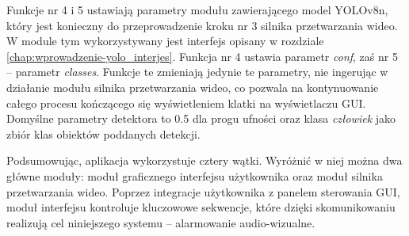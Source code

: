 Funkcje nr 4 i 5 ustawiają parametry modułu zawierającego model YOLOv8n, który jest konieczny do przeprowadzenie kroku nr 3 silnika przetwarzania wideo. 
W module tym wykorzystywany jest interfejs opisany w rozdziale \ref{chap:wprowadzenie-yolo_interjes}. 
Funkcja nr 4 ustawia parametr \emph{conf}, zaś nr 5 -- parametr \emph{classes}. 
Funkcje te zmieniają jedynie te parametry, nie ingerując w działanie modułu silnika przetwarzania wideo, co pozwala na kontynuowanie całego procesu kończącego się wyświetleniem klatki na wyświetlaczu GUI.
Domyślne parametry detektora to 0.5 dla progu ufności oraz klasa \emph{człowiek} jako zbiór klas obiektów poddanych detekcji.

Podsumowując, aplikacja wykorzystuje cztery wątki. Wyróżnić w niej można dwa główne moduły: moduł graficznego interfejsu użytkownika oraz moduł silnika przetwarzania wideo. Poprzez integracje użytkownika z panelem sterowania GUI, moduł interfejsu kontroluje kluczowowe sekwencje, które dzięki skomunikowaniu realizują cel niniejszego systemu -- alarmowanie audio-wizualne.  